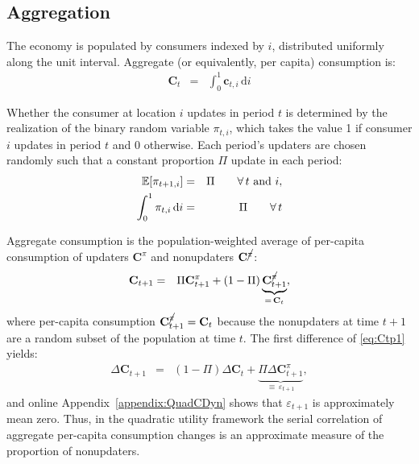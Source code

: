 \documentclass[titlepage]{./econtex}
\begin{document}
\subsection{Aggregation}

The economy is populated by consumers indexed by $i$, distributed uniformly along the unit interval.  Aggregate (or equivalently, per capita) consumption is:
\begin{eqnarray*}
        \mathbf{C}_{t} & = & \int_{0}^{1} \mathbf{c}_{t,i}\,\text{d}i
\end{eqnarray*}
 
Whether the consumer at location $i$ updates in period $t$ is determined by the realization of the binary random variable $\pi_{t,i}$, which takes the value 1 if consumer $i$ updates in period $t$ and 0 otherwise.  Each period's updaters are chosen randomly such that a constant proportion $\Pi$ update in each period:
\begin{eqnarray*}
   \operatorname{\mathbb{E}}[\pi_{t+1,i}] &= & \Pi \qquad \forall\,t \text{ and } i,
\\ \int_{0}^{1} \pi_{t,i}\,\text{d}i & = & \Pi \qquad \forall\,t
\end{eqnarray*}

Aggregate consumption is the population-weighted average of per-capita consumption of updaters $\mathbf{C}^{\pi}$ and nonupdaters $\mathbf{C}^{\cancel{\pi}}$:
\begin{eqnarray}
 \mathbf{C}_{t+1} & = & \Pi \mathbf{C}^{{\pi}}_{t+1}+(1-\Pi) \underbrace{\mathbf{C}^{\cancel{{\pi}}}_{t+1}}_{=\,\mathbf{C}_{t}}, \label{eq:Ctp1}
\end{eqnarray}
where per-capita consumption $\mathbf{C}^{\cancel{{\pi}}}_{t+1}=\mathbf{C}_{t}$ because the
nonupdaters at time $t+1$ are a random subset of the population at time $t$.
The first difference of \eqref{eq:Ctp1} yields:
\begin{eqnarray*}
  \Delta \mathbf{C}_{t+1} & = &  (1-\Pi) \Delta \mathbf{C}_{t} + \underbrace{\Pi \Delta \mathbf{C}^{{\pi}}_{t+1}}_{\equiv\,\varepsilon_{t+1}}, \label{eq:deltac} \label{eq:dCQuadStickyApprox}
\end{eqnarray*}
and online Appendix~\ref{appendix:QuadCDyn} shows that $\varepsilon_{t+1}$ is approximately mean zero. Thus, in the quadratic utility framework the serial correlation of aggregate per-capita consumption changes is an approximate measure of the proportion of nonupdaters.
\end{document}
